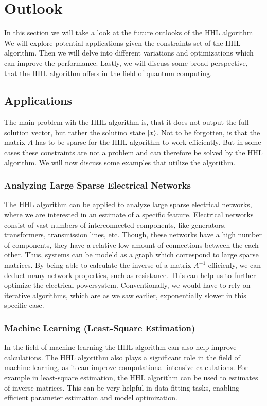 \section{Outlook}
In this section we will take a look at the future outlooks of the HHL algorithm
We will explore potential applications given the constraints set of the HHL algorithm.
Then we will delve into different variations and optimizations which can improve the performance. 
Lastly, we will discuss some broad perspective, that the HHL algorithm offers in the field of quantum computing. 

\subsection{Applications}
The main problem wih the HHL algorithm is, that it does not output the full solution vector, but rather the solutino state $\ket x$.
Not to be forgotten, is that the matrix $A$ has to be sparse for the HHL algorithm to work efficiently.
But in some cases these constraints are not a problem and can therefore be solved by the HHL algorithm.
We will now discuss some examples that utilize the algorithm. 


    \subsubsection{Analyzing Large Sparse Electrical Networks}
    The HHL algorithm can be applied to analyze large sparse electrical networks, where we are interested in an estimate of a specific feature.
    Electrical networks consist of vast numbers of interconnected components, like generators, transformers, transmission lines, etc. 
    Though, these networks have a high number of components, they have a relative low amount of connections between the each other.
    Thus, systems can be modeld as a graph which correspond to large sparse matrices.
    By being able to calculate the inverse of a matrix $A^{-1}$ efficienly, we can deduct many network properties, such as resistance. 
    This can help us to further optimize the electrical powersystem.
    Conventionally, we would have to rely on iterative algorithms, which are as we saw earlier, exponentially slower in this specific case.
    
    \subsubsection{Machine Learning (Least-Square Estimation)}
    In the field of machine learning the HHL algorithm can also help improve calculations. 
    The HHL algorithm also plays a significant role in the field of machine learning, as it can improve computational intensive calculations.
    For example in least-square estimation, the HHL algorithm can be used to estimates of inverse matrices. 
    This can be very helpful in data fitting tasks, enabling efficient parameter estimation and model optimization.
    
